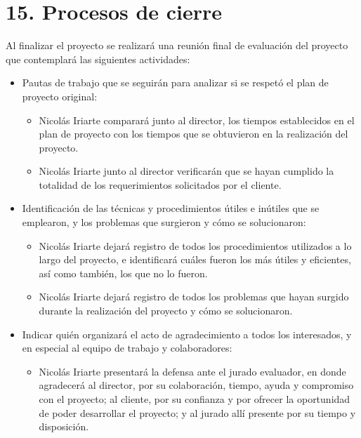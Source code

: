 \section{15. Procesos de cierre}
\label{sec:cierre}

Al finalizar el proyecto se realizará una reunión final de evaluación del proyecto que contemplará
las siguientes actividades:

\begin{itemize}
\item Pautas de trabajo que se seguirán para analizar si se respetó el plan de proyecto original:

  \begin{itemize}
  \item  Nicolás Iriarte comparará junto al director, los tiempos establecidos en el plan de proyecto con los tiempos que se obtuvieron en la realización del proyecto.
  \item Nicolás Iriarte junto al director verificarán que se hayan cumplido la totalidad de los requerimientos solicitados por el cliente.
  \end{itemize}

\item Identificación de las técnicas y procedimientos útiles e inútiles que se emplearon, y los problemas que surgieron y cómo se solucionaron:

  \begin{itemize}
  \item Nicolás Iriarte dejará registro de todos los procedimientos utilizados a lo largo del proyecto, e identificará cuáles fueron los más útiles y eficientes, así como también, los que no lo fueron.
  \item Nicolás Iriarte dejará registro de todos los problemas que hayan surgido durante la realización del proyecto y cómo se solucionaron.
  \end{itemize}

\item Indicar quién organizará el acto de agradecimiento a todos los interesados, y en especial al equipo de trabajo y colaboradores:

  \begin{itemize}
  \item Nicolás Iriarte presentará la defensa ante el jurado evaluador, en donde agradecerá al director, por su colaboración, tiempo, ayuda y compromiso con el proyecto; al cliente, por su confianza y por ofrecer la oportunidad de poder desarrollar el proyecto; y al jurado allí presente por su tiempo y disposición.
  \end{itemize}

\end{itemize}
